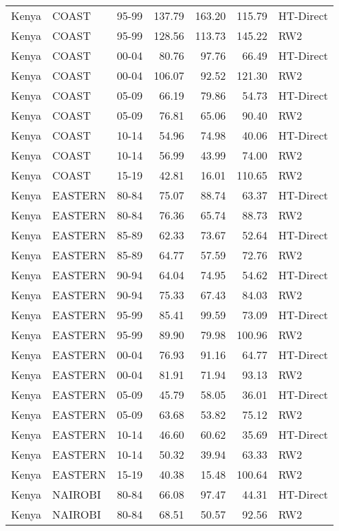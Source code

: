\begin{longtable}{lllrrrl}
  Kenya & COAST & 95-99 & 137.79 & 163.20 & 115.79 & HT-Direct \\ 
  Kenya & COAST & 95-99 & 128.56 & 113.73 & 145.22 & RW2 \\ 
  Kenya & COAST & 00-04 & 80.76 & 97.76 & 66.49 & HT-Direct \\ 
  Kenya & COAST & 00-04 & 106.07 & 92.52 & 121.30 & RW2 \\ 
  Kenya & COAST & 05-09 & 66.19 & 79.86 & 54.73 & HT-Direct \\ 
  Kenya & COAST & 05-09 & 76.81 & 65.06 & 90.40 & RW2 \\ 
  Kenya & COAST & 10-14 & 54.96 & 74.98 & 40.06 & HT-Direct \\ 
  Kenya & COAST & 10-14 & 56.99 & 43.99 & 74.00 & RW2 \\ 
  Kenya & COAST & 15-19 & 42.81 & 16.01 & 110.65 & RW2 \\ 
  Kenya & EASTERN & 80-84 & 75.07 & 88.74 & 63.37 & HT-Direct \\ 
  Kenya & EASTERN & 80-84 & 76.36 & 65.74 & 88.73 & RW2 \\ 
  Kenya & EASTERN & 85-89 & 62.33 & 73.67 & 52.64 & HT-Direct \\ 
  Kenya & EASTERN & 85-89 & 64.77 & 57.59 & 72.76 & RW2 \\ 
  Kenya & EASTERN & 90-94 & 64.04 & 74.95 & 54.62 & HT-Direct \\ 
  Kenya & EASTERN & 90-94 & 75.33 & 67.43 & 84.03 & RW2 \\ 
  Kenya & EASTERN & 95-99 & 85.41 & 99.59 & 73.09 & HT-Direct \\ 
  Kenya & EASTERN & 95-99 & 89.90 & 79.98 & 100.96 & RW2 \\ 
  Kenya & EASTERN & 00-04 & 76.93 & 91.16 & 64.77 & HT-Direct \\ 
  Kenya & EASTERN & 00-04 & 81.91 & 71.94 & 93.13 & RW2 \\ 
  Kenya & EASTERN & 05-09 & 45.79 & 58.05 & 36.01 & HT-Direct \\ 
  Kenya & EASTERN & 05-09 & 63.68 & 53.82 & 75.12 & RW2 \\ 
  Kenya & EASTERN & 10-14 & 46.60 & 60.62 & 35.69 & HT-Direct \\ 
  Kenya & EASTERN & 10-14 & 50.32 & 39.94 & 63.33 & RW2 \\ 
  Kenya & EASTERN & 15-19 & 40.38 & 15.48 & 100.64 & RW2 \\ 
  Kenya & NAIROBI & 80-84 & 66.08 & 97.47 & 44.31 & HT-Direct \\ 
  Kenya & NAIROBI & 80-84 & 68.51 & 50.57 & 92.56 & RW2 \\ 

\end{longtable}
